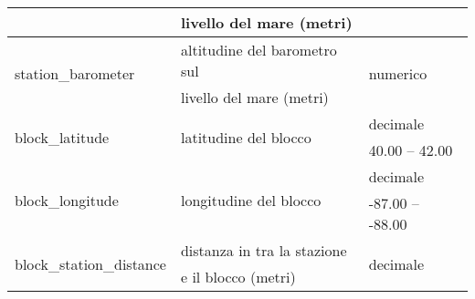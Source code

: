 \begin{longtable}{lll}
	& livello del mare (metri) & \\ \hline
	\multirow{2}{*}{station\_barometer}			& 	altitudine del barometro 
	sul  & \multirow{2}{*}{numerico}		\\
	& livello del mare (metri) &\\ \hline	
	\multirow{2}{*}{block\_latitude}	& \multirow{2}{*}{latitudine del 
		blocco}	&  decimale    \\ 
	& & {40.00} -- {42.00}  \\ \hline
	\multirow{2}{*}{block\_longitude}	& \multirow{2}{*}{longitudine del 
		blocco} &  decimale     \\ 
	& & {-87.00} -- {-88.00} \\ \hline 
	\multirow{2}{*}{block\_station\_distance}	& distanza in tra la stazione  
	&  \multirow{2}{*}{decimale} \\ 
	& e il blocco (metri) &\\  
	\bottomrule
\end{longtable}
\label{tab:features}
